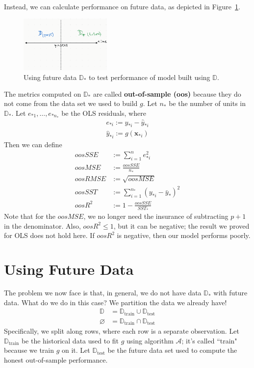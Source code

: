 \documentclass[12pt, a4paper]{article}
\theoremstyle{definition}
\begin{document}
	Instead, we can calculate performance on future data, as depicted in Figure~\ref{fig:future-data}.
	\begin{figure}
		\centering
		\includegraphics[width=0.4\textwidth]{future-data}
		\caption{Using future data $\mathbb{D}_*$ to test performance of model
		built using $\mathbb{D}$.}
		\label{fig:future-data}
	\end{figure}
	The metrics computed on $\mathbb{D}_*$ are called \textbf{out-of-sample (oos)}
	because they do not come from the data set we used to build $g$.
	Let $n_*$ be the number of units in $\mathbb{D}_*$. Let $e_{*1},\ldots,e_{*n_*}$
	be the OLS residuals, where
	\begin{align*}
		e_{*i}:=y_{*i}-\hat{y}_{*i}\\
		\hat{y}_{*i} := g(\mathbf{x}_{*i})
	\end{align*}
	Then we can define
	\begin{align*}
		oosSSE &:= \sum_{i=1}^{n}e_{*i}^2\\
		oosMSE &:= \frac{oosSSE}{n_*}\\
		oosRMSE &:= \sqrt{oosMSE}\\
		oosSST &:= \sum_{i=1}^{n_*}(y_{*i}-\bar{y}_*)^2\\
		oosR^2 &:= 1 - \frac{oosSSE}{SST_*}
	\end{align*}
	Note that for the $oosMSE$, we no longer need the insurance 
	of subtracting $p+1$ in the denominator. Also, $oosR^2\leq 1$, but it can be
	negative; the result we proved for OLS does not hold here. If $oosR^2$ is negative,
	then our model performs poorly.
	\section*{Using Future Data}
	The problem we now face is that, in general, we do not have data $\mathbb{D}_*$
	with future data. What do we do in this case? We partition the data we already have!
	\begin{align*}
		\mathbb{D} &= \mathbb{D}_{\text{train}} \cup \mathbb{D}_{\text{test}}\\
		\varnothing &= \mathbb{D}_{\text{train}} \cap \mathbb{D}_{\text{test}}
	\end{align*}
	Specifically, we split along rows, where each row is a separate observation.
	Let $\mathbb{D}_{\text{train}}$ be the historical data used to fit $g$
	using algorithm $\mathcal{A}$; it's called ``train" because we train $g$ on it.
	Let $\mathbb{D}_{\text{test}}$ be the future data set used to compute the
	honest out-of-sample performance.
	
\end{document}
